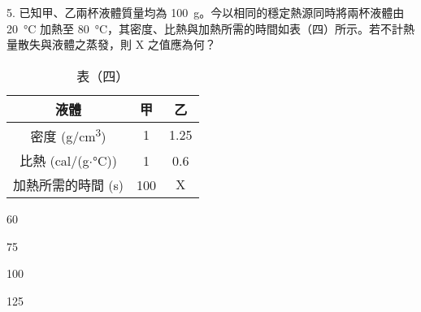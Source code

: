 \documentclass[12pt]{article}
\begin{document}
\begin{problem}
  \item[5.] 已知甲、乙兩杯液體質量均為 \qty{100}{g}。今以相同的穩定熱源同時將兩杯液體由 \qty{20}{\degreeCelsius} 加熱至 \qty{80}{\degreeCelsius}，其密度、比熱與加熱所需的時間如表（四）所示。若不計熱量散失與液體之蒸發，則 $\mathrm{X}$ 之值應為何？
  \begin{table}[ht]
    \centering
    \renewcommand{\arraystretch}{1.2}
    \vspace*{-1ex}
    \caption*{表（四）}
    \vspace*{-1ex}
    \begin{tabular}{|c|c|c|}
      \hline
      液體 & 甲 & 乙 \\ \hline
      密度 (\unit{g}/\unit{cm^3}) & 1 & 1.25 \\ \hline
      比熱 (\unit{cal}/(\unit{\gram}$\cdot$\unit{\degreeCelsius})) & 1 & 0.6 \\ \hline
      加熱所需的時間 (\unit{\second}) & 100 & $\mathrm{X}$ \\ \hline
    \end{tabular}
    \vspace*{-2ex}
  \end{table}
  \begin{choices}
    \item 60
    \item 75
    \item 100
    \item 125
  \end{choices}
\end{problem}
\end{document}
